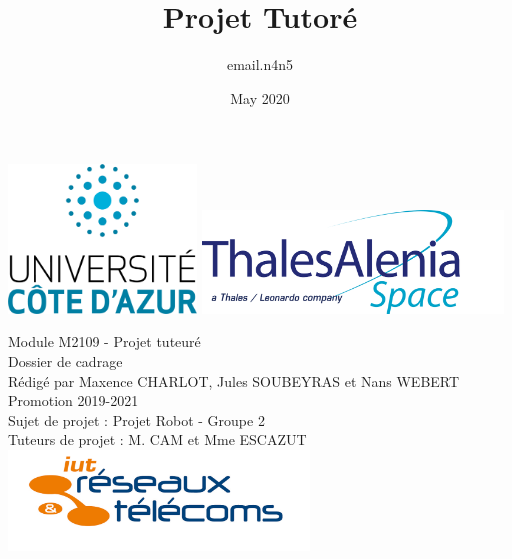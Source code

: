 \documentclass{PackagerQualityN}
\title{Projet Tutoré}
\author{email.n4n5 }
\date{May 2020}
\begin{document}
\begin{titlepage}%


\includegraphics[width=5cm]{img/univ.png}
\hfill
\includegraphics[width=8cm]{img/logoThales.png}


\begin{center}
\Huge
Module M2109 - Projet tuteuré\\
Dossier de cadrage
\\
\vspace{1cm}
\vspace{1cm}
\large
Rédigé par Maxence CHARLOT, Jules SOUBEYRAS et Nans WEBERT\\
Promotion 2019-2021\\
\vspace{3.5cm}
Sujet de projet : Projet Robot - Groupe 2\\
Tuteurs de projet : M. CAM et Mme ESCAZUT\\
\vspace{1cm}
\includegraphics[width=8cm]{img/logoRetT.png}
\hfill


\end{center}


\end{titlepage}


\newp       %
\setcounter{tocdepth}{2}
\tableofcontents
{}
\end{document}
